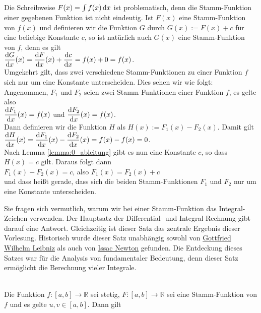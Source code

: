 Die Schreibweise $F(x) = \int f(x) \, \textrm{d} x$ ist problematisch, denn die Stamm-Funktion einer
gegebenen Funktion ist nicht eindeutig.  Ist $F(x)$ eine Stamm-Funktion von $f(x)$ und
definieren wir die Funktion $G$ durch $G(x) := F(x) + c$ f\"ur eine beliebige Konstante $c$,
so ist nat\"urlich auch $G(x)$ eine Stamm-Funktion von $f$, denn es gilt
\\[0.2cm]
\hspace*{1.3cm}
$\displaystyle\frac{\textrm{d}G}{\textrm{d}x}(x) = \displaystyle\frac{\textrm{d}F}{\textrm{d}x}(x) + \displaystyle\frac{\textrm{d}c}{\textrm{d}x} = f(x) + 0 = f(x)$.
\\[0.2cm]
Umgekehrt gilt, dass zwei verschiedene Stamm-Funktionen zu einer Funktion $f$ sich nur um
eine Konstante unterscheiden.  Dies sehen wir wie folgt: Angenommen, $F_1$ und $F_2$ seien
zwei Stamm-Funktionen einer Funktion $f$, es gelte also 
\\[0.2cm]
\hspace*{1.3cm}
$\displaystyle\frac{\textrm{d}F_1}{\textrm{d}x}(x) = f(x)$ \quad und \quad $\displaystyle\frac{\textrm{d}F_2}{\textrm{d}x}(x) = f(x)$.
\\[0.2cm]
Dann definieren wir die Funktion $H$ als $H(x) := F_1(x) - F_2(x)$.  Damit gilt
\\[0.2cm]
\hspace*{1.3cm}
$\displaystyle\frac{\textrm{d}H}{\textrm{d}x}(x) = \displaystyle\frac{\textrm{d}F_1}{\textrm{d}x}(x) - \displaystyle\frac{\textrm{d}F_2}{\textrm{d}x}(x) = f(x) - f(x) = 0$.
\\[0.2cm]
Nach Lemma \ref{lemma:0_ableitung} gibt es nun eine Konstante $c$, so dass $H(x) = c$ gilt.
Daraus folgt dann
\\[0.2cm]
\hspace*{1.3cm}
$F_1(x) - F_2(x) = c$, \quad also \quad $F_1(x) = F_2(x) + c$
\\[0.2cm]
und dass hei{\ss}t gerade, dass sich die beiden Stamm-Funktionen $F_1$ und $F_2$ nur um eine Konstante
unterscheiden.   

Sie fragen sich vermutlich, warum wir bei einer Stamm-Funktion das Integral-Zeichen verwenden.
Der Hauptsatz der Differential- und Integral-Rechnung gibt darauf eine Antwort.  Gleichzeitig ist
dieser Satz das zentrale Ergebnis dieser Vorlesung.  Historisch wurde dieser Satz unabh\"angig sowohl
von \href{https://en.wikipedia.org/wiki/Gottfried_Wilhelm_Leibniz}{Gottfried Wilhelm Leibniz} als
auch von \href{https://en.wikipedia.org/wiki/Isaac_Newton}{Issac Newton} gefunden.  Die Entdeckung
dieses Satzes war f\"ur die Analysis von  fundamentaler Bedeutung, denn dieser Satz erm\"oglicht die
Berechnung vieler Integrale.

\begin{Satz} \hspace*{\fill} \\
 Die Funktion $f:[a,b] \rightarrow\mathbb{R}$ sei stetig, $F:[a,b] \rightarrow\mathbb{R}$
sei eine Stamm-Funktion von $f$ und es gelte $u,v\in[a,b]$.  Dann gilt
\\[0.2cm]
\hspace*{1.3cm}
\colorbox{orange}{}  
\end{Satz}

